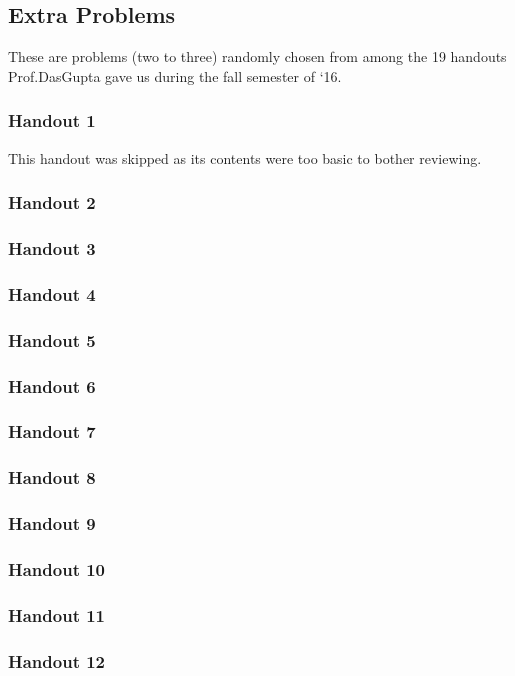 \subsection{Extra Problems}
These are problems (two to three) randomly chosen from among the 19
handouts Prof.\@ DasGupta gave us during the fall semester of `16.
\subsubsection{Handout 1}
This handout was skipped as its contents were too basic to bother
reviewing.
\subsubsection{Handout 2}
\subsubsection{Handout 3}
\subsubsection{Handout 4}
\subsubsection{Handout 5}
\subsubsection{Handout 6}
\subsubsection{Handout 7}
\subsubsection{Handout 8}
\subsubsection{Handout 9}
\subsubsection{Handout 10}
\subsubsection{Handout 11}
\subsubsection{Handout 12}
